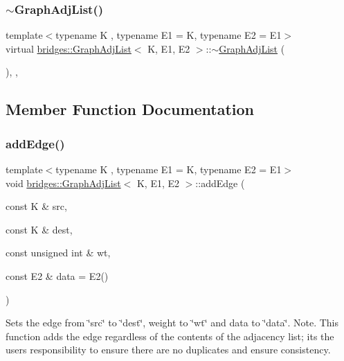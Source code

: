 \subsubsection{\texorpdfstring{$\sim$\+Graph\+Adj\+List()}{~GraphAdjList()}}
{\footnotesize\ttfamily template$<$typename K , typename E1  = K, typename E2  = E1$>$ \\
virtual \mbox{\hyperlink{classbridges_1_1_graph_adj_list}{bridges\+::\+Graph\+Adj\+List}}$<$ K, E1, E2 $>$\+::$\sim$\mbox{\hyperlink{classbridges_1_1_graph_adj_list}{Graph\+Adj\+List}} (\begin{DoxyParamCaption}{ }\end{DoxyParamCaption})\hspace{0.3cm}{\ttfamily [inline]}, {\ttfamily [override]}, {\ttfamily [virtual]}}



\subsection{Member Function Documentation}
\mbox{\label{classbridges_1_1_graph_adj_list_acd9a3bf8e544a6b78e75acd6bf1d57ee}} 
\subsubsection{\texorpdfstring{add\+Edge()}{addEdge()}}
{\footnotesize\ttfamily template$<$typename K , typename E1  = K, typename E2  = E1$>$ \\
void \mbox{\hyperlink{classbridges_1_1_graph_adj_list}{bridges\+::\+Graph\+Adj\+List}}$<$ K, E1, E2 $>$\+::add\+Edge (\begin{DoxyParamCaption}\item[{const K \&}]{src,  }\item[{const K \&}]{dest,  }\item[{const unsigned int \&}]{wt,  }\item[{const E2 \&}]{data = {\ttfamily E2()} }\end{DoxyParamCaption})\hspace{0.3cm}{\ttfamily [inline]}}

Sets the edge from \char`\"{}src\char`\"{} to \char`\"{}dest\char`\"{}, weight to \char`\"{}wt\char`\"{} and data to \char`\"{}data\char`\"{}. Note. This function adds the edge regardless of the contents of the adjacency list; its the user\textquotesingle{}s responsibility to ensure there are no duplicates and ensure consistency.


